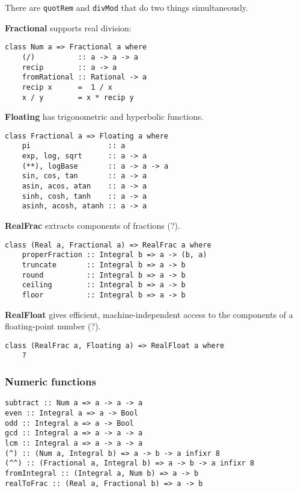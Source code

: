There are \texttt{quotRem} and \texttt{divMod} that do two things simultaneously.

\textbf{Fractional} supports real division:
\begin{verbatim}
class Num a => Fractional a where
    (/)          :: a -> a -> a
    recip        :: a -> a
    fromRational :: Rational -> a
    recip x      =  1 / x
    x / y        = x * recip y
\end{verbatim}

\textbf{Floating} has trigonometric and hyperbolic functions.
\begin{verbatim}
class Fractional a => Floating a where
    pi                  :: a
    exp, log, sqrt      :: a -> a
    (**), logBase       :: a -> a -> a
    sin, cos, tan       :: a -> a
    asin, acos, atan    :: a -> a
    sinh, cosh, tanh    :: a -> a
    asinh, acosh, atanh :: a -> a
\end{verbatim}

\textbf{RealFrac} extracts components of fractions (?).
\begin{verbatim}
class (Real a, Fractional a) => RealFrac a where
    properFraction :: Integral b => a -> (b, a)
    truncate       :: Integral b => a -> b
    round          :: Integral b => a -> b
    ceiling        :: Integral b => a -> b
    floor          :: Integral b => a -> b
\end{verbatim}

\textbf{RealFloat} gives efficient, machine-independent access to the components of a floating-point number (?).
\begin{verbatim}
class (RealFrac a, Floating a) => RealFloat a where
    ?
\end{verbatim}

\subsubsection{Numeric functions}
\begin{verbatim}
subtract :: Num a => a -> a -> a
even :: Integral a => a -> Bool
odd :: Integral a => a -> Bool
gcd :: Integral a => a -> a -> a
lcm :: Integral a => a -> a -> a
(^) :: (Num a, Integral b) => a -> b -> a infixr 8
(^^) :: (Fractional a, Integral b) => a -> b -> a infixr 8
fromIntegral :: (Integral a, Num b) => a -> b
realToFrac :: (Real a, Fractional b) => a -> b
\end{verbatim}

%